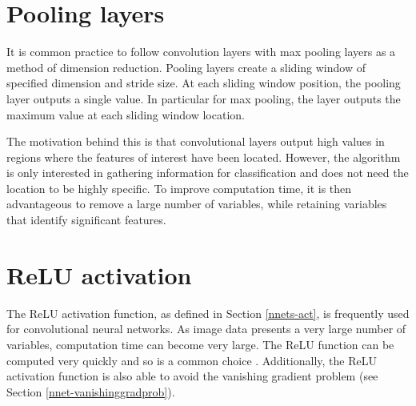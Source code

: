 \section{Pooling layers}\label{convnets-pool}

It is common practice to follow convolution layers with max pooling layers as a method of dimension reduction\cite{ADeshpande2016}. Pooling layers create a sliding window of specified dimension and stride size. At each sliding window position, the pooling layer outputs a single value. In particular for max pooling, the layer outputs the maximum value at each sliding window location.

The motivation behind this is that convolutional layers output high values in regions where the features of interest have been located. However, the algorithm is only interested in gathering information for classification and does not need the location to be highly specific. To improve computation time, it is then advantageous to remove a large number of variables, while retaining variables that identify significant features.

\section{ReLU activation}\label{convnets-act}

The ReLU activation function, as defined in Section \ref{nnets-act}, is frequently used for  convolutional neural networks. As image data presents a very large number of variables, computation time can become very large. The ReLU function can be computed very quickly and so is a common choice \cite{ADeshpande2016}. Additionally, the ReLU activation function is also able to avoid the vanishing gradient problem (see Section \ref{nnet-vanishinggradprob}).


%
%

